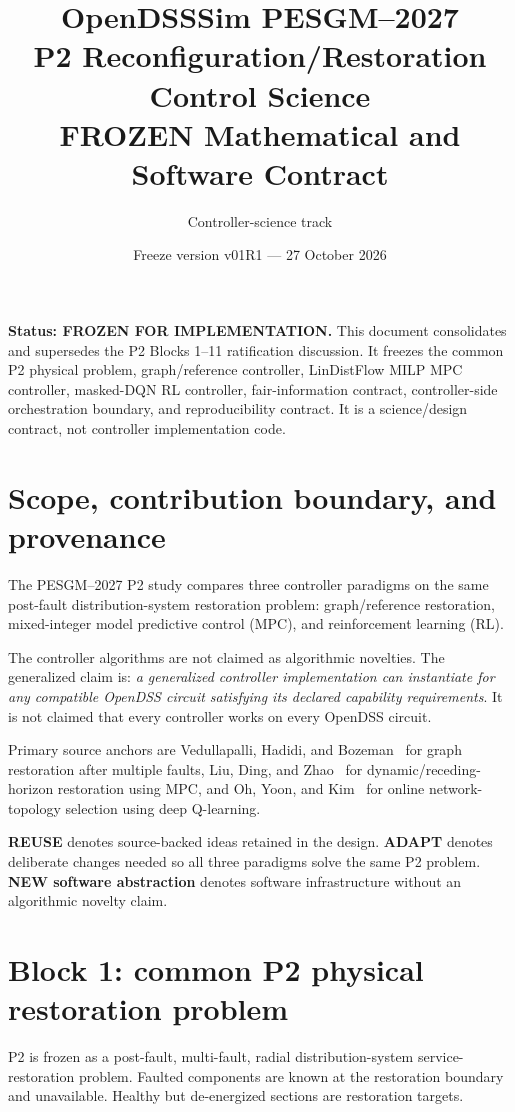 \documentclass[11pt]{article}
\title{\textbf{OpenDSSSim PESGM--2027}\\P2 Reconfiguration/Restoration Control Science\\\textbf{FROZEN Mathematical and Software Contract}}
\author{Controller-science track}
\date{Freeze version v01R1 --- 27 October 2026}
\begin{document}
\maketitle
\begin{center}
\begin{minipage}{0.94\linewidth}
\textbf{Status: FROZEN FOR IMPLEMENTATION.}
This document consolidates and supersedes the P2 Blocks 1--11 ratification discussion.
It freezes the common P2 physical problem, graph/reference controller, LinDistFlow
MILP MPC controller, masked-DQN RL controller, fair-information contract,
controller-side orchestration boundary, and reproducibility contract. It is a
science/design contract, not controller implementation code.
\end{minipage}
\end{center}
\tableofcontents
\newpage

\section{Scope, contribution boundary, and provenance}
The PESGM--2027 P2 study compares three controller paradigms on the same post-fault
distribution-system restoration problem: graph/reference restoration, mixed-integer
model predictive control (MPC), and reinforcement learning (RL).

The controller algorithms are not claimed as algorithmic novelties. The generalized
claim is: \emph{a generalized controller implementation can instantiate for any
compatible OpenDSS circuit satisfying its declared capability requirements}. It is
not claimed that every controller works on every OpenDSS circuit.

Primary source anchors are Vedullapalli, Hadidi, and Bozeman~\cite{Vedullapalli2020}
for graph restoration after multiple faults, Liu, Ding, and Zhao~\cite{Liu2020} for
dynamic/receding-horizon restoration using MPC, and Oh, Yoon, and Kim~\cite{Oh2020}
for online network-topology selection using deep Q-learning.

\textbf{REUSE} denotes source-backed ideas retained in the design.
\textbf{ADAPT} denotes deliberate changes needed so all three paradigms solve the
same P2 problem. \textbf{NEW software abstraction} denotes software infrastructure
without an algorithmic novelty claim.

\section{Block 1: common P2 physical restoration problem}
P2 is frozen as a post-fault, multi-fault, radial distribution-system
service-restoration problem. Faulted components are known at the restoration
boundary and unavailable. Healthy but de-energized sections are restoration targets.
\end{document}
